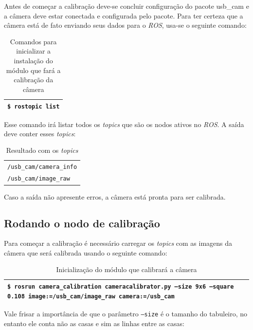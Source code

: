 Antes de começar a calibração deve-se concluir configuração do pacote usb\_cam e a câmera deve estar conectada e configurada pelo pacote. Para ter certeza que a câmera está de fato enviando seus dados para o \textit{ROS}, usa-se o seguinte comando:

\begin{table}[!ht]\label{tb:2}
\begin{tabular}{| p{\textwidth}|}
\hline
\texttt{\$ rostopic list}\\
\hline
\end{tabular}
\caption{Comandos para inicializar a instalação do módulo que fará a calibração da câmera}
\end{table}

Esse comando irá listar todos os \textit{topics} que são os nodos ativos no \textit{ROS}. A saída deve conter esses \textit{topics}:

\begin{table}[!ht]\label{tb:3}
\begin{tabular}{| p{\textwidth}|}
\hline
\texttt{/usb\_cam/camera\_info} \\
\texttt{/usb\_cam/image\_raw}\\
\hline
\end{tabular}
\caption{Resultado com os \textit{topics}}
\end{table}

Caso a saída não apresente erros, a câmera está pronta para ser calibrada.

\subsection{Rodando o nodo de calibração}

Para começar a calibração é necessário carregar os \textit{topics} com as imagens da câmera que será calibrada usando o seguinte comando:

\begin{table}[!ht]\label{tb:4}
\begin{tabular}{| p{\textwidth}|}
\hline
\texttt{\$ rosrun camera\_calibration cameracalibrator.py --size 9x6 --square 0.108 image:=/usb\_cam/image\_raw camera:=/usb\_cam}\\
\hline
\end{tabular}
\caption{Inicialização do módulo que calibrará a câmera}
\end{table}

Vale frisar a importância de que o parâmetro \texttt{--size} é o tamanho do tabuleiro, no entanto ele conta não as casas e sim as linhas entre as casas:

